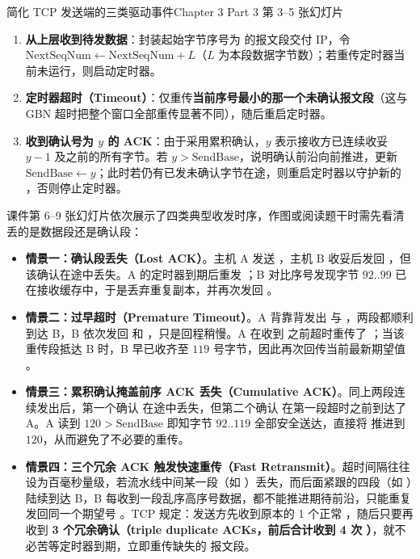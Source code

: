 \begin{StudyBlock}{简化 TCP 发送端的三类驱动事件}{Chapter 3 Part 3 第 3–5 张幻灯片}
\begin{enumerate}
\item \textbf{从上层收到待发数据}：封装起始字节序号为  的报文段交付 IP，令 $\mathrm{NextSeqNum} \leftarrow \mathrm{NextSeqNum} + L$（$L$ 为本段数据字节数）；若重传定时器当前未运行，则启动定时器。
\item \textbf{定时器超时（Timeout）}：仅重传\textbf{当前序号最小的那一个未确认报文段}（这与 GBN 超时把整个窗口全部重传显著不同），随后重启定时器。
\item \textbf{收到确认号为 $y$ 的 ACK}：由于采用累积确认，$y$ 表示接收方已连续收妥 $y-1$ 及之前的所有字节。若 $y > \mathrm{SendBase}$，说明确认前沿向前推进，更新 $\mathrm{SendBase} \leftarrow y$；此时若仍有已发未确认字节在途，则重启定时器以守护新的 ，否则停止定时器。
\end{enumerate}
\end{StudyBlock}

课件第 6–9 张幻灯片依次展示了四类典型收发时序，作图或阅读题干时需先看清丢的是数据段还是确认段：
\begin{itemize}
\item \textbf{情景一：确认段丢失（Lost ACK）}。主机 A 发送 ，主机 B 收妥后发回 ，但该确认在途中丢失。A 的定时器到期后重发 ；B 对比序号发现字节 $92..99$ 已在接收缓存中，于是丢弃重复副本，并再次发回 。
\item \textbf{情景二：过早超时（Premature Timeout）}。A 背靠背发出  与 ，两段都顺利到达 B，B 依次发回  和 ，只是回程稍慢。A 在收到  之前超时重传了 ；当该重传段抵达 B 时，B 早已收齐至 $119$ 号字节，因此再次回传当前最新期望值 。
\item \textbf{情景三：累积确认掩盖前序 ACK 丢失（Cumulative ACK）}。同上两段连续发出后，第一个确认  在途中丢失，但第二个确认  在第一段超时之前到达了 A。A 读到 $120 > \mathrm{SendBase}$ 即知字节 $92..119$ 全部安全送达，直接将  推进到 $120$，从而避免了不必要的重传。
\item \textbf{情景四：三个冗余 ACK 触发快速重传（Fast Retransmit）}。超时间隔往往设为百毫秒量级，若流水线中间某一段（如 ）丢失，而后面紧跟的四段（如 ）陆续到达 B，B 每收到一段乱序高序号数据，都不能推进期待前沿，只能重复发回同一个期望号 。TCP 规定：发送方先收到原本的 1 个正常 ，随后只要再收到 \textbf{3 个冗余确认（triple duplicate ACKs，前后合计收到 4 次 ）}，就不必苦等定时器到期，立即重传缺失的  报文段。
\end{itemize}

